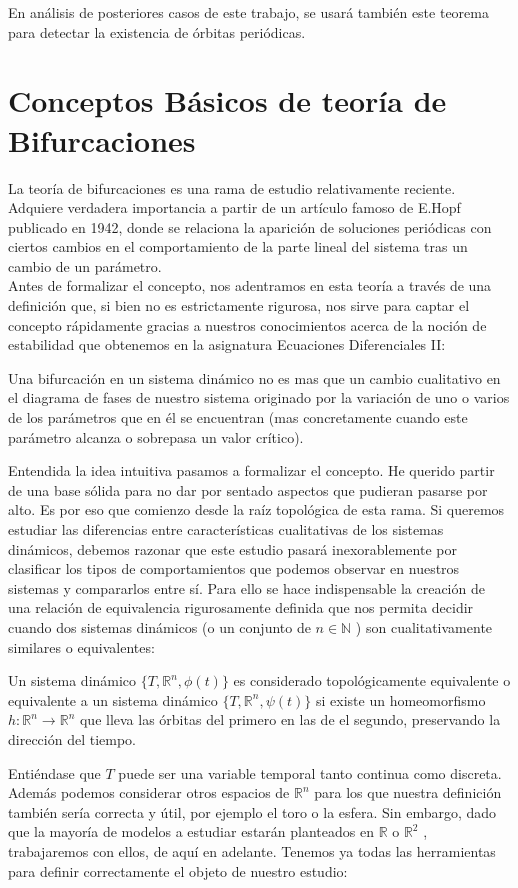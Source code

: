 En análisis de posteriores casos de este trabajo, se usará también este teorema para detectar la existencia de órbitas periódicas.
 
 
 
 \section{Conceptos Básicos de teoría de Bifurcaciones}
 La teoría de bifurcaciones es una rama de estudio relativamente reciente. Adquiere verdadera importancia  a partir de un artículo famoso de E.Hopf publicado en 1942, donde se relaciona la aparición de soluciones periódicas con ciertos cambios en el comportamiento de la parte lineal del sistema tras un cambio de un parámetro.\\
 Antes de formalizar el concepto, nos adentramos en esta teoría a través de una definición que, si bien no es estrictamente rigurosa, nos sirve para captar el concepto rápidamente gracias a nuestros conocimientos acerca de la noción de estabilidad que obtenemos en la asignatura Ecuaciones Diferenciales II: 
 \begin{defi}
 	Una bifurcación en un sistema dinámico no es mas que un cambio cualitativo en el diagrama de fases de nuestro sistema originado por la variación de uno o varios de los parámetros que en él se encuentran (mas concretamente cuando este parámetro alcanza o sobrepasa un valor crítico).
 \end{defi}
 Entendida la idea intuitiva pasamos a formalizar el concepto. He querido partir de una base sólida para no dar por sentado aspectos que pudieran pasarse por alto. Es por eso que comienzo desde la raíz topológica de esta rama.
 Si queremos estudiar las diferencias entre características cualitativas de los sistemas dinámicos, debemos razonar que este estudio pasará inexorablemente por clasificar los tipos de comportamientos que podemos observar en nuestros sistemas y compararlos entre sí. Para ello se hace indispensable la creación de una relación de equivalencia rigurosamente definida que nos permita decidir cuando dos sistemas dinámicos (o un conjunto de $n \in \mathbb{N}$ ) son cualitativamente similares o equivalentes:
 \begin{defi}
 	Un sistema dinámico $ \{T, \mathbb{R}^n , \phi(t) \}$ es considerado topológicamente equivalente o equivalente a un sistema dinámico $ \{T, \mathbb{R}^n , \psi(t) \}$ si existe un homeomorfismo $h : \mathbb{R}^n \rightarrow \mathbb{R}^n$ que lleva las órbitas del primero en las de el segundo, preservando la dirección del tiempo.
 	\label{topequi}
 \end{defi}
 Entiéndase que $T$ puede ser una variable temporal tanto continua como discreta. Además podemos considerar otros espacios de $\mathbb{R}^n$ para los que nuestra definición también sería correcta y útil, por ejemplo el toro o la esfera.
 Sin embargo, dado que la mayoría de modelos a estudiar estarán planteados en $\mathbb{R}$ o $\mathbb{R}^2$ , trabajaremos con ellos, de aquí en adelante.
 Tenemos ya todas las herramientas para definir correctamente el objeto de nuestro estudio: \\
 
